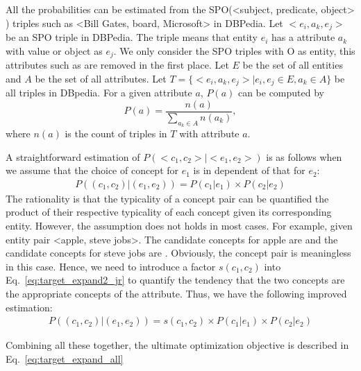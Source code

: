 All the probabilities can be estimated from the SPO(\ac{<subject, predicate, object>} ) triples such as \ac{<Bill Gates, board, Microsoft>}  in DBPedia.
Let $<e_i, a_k, e_j>$ be an SPO triple in DBPedia.
The triple means that entity $e_i$ has a attribute $a_k$ with value or object as $e_j$.
We only consider the SPO triples with O as entity, this attributes such as  are removed in the first place.
Let $E$ be the set of all entities and $A$ be the set of all attributes.
Let $T=\{<e_i, a_k, e_j> | e_i,e_j\in E, a_k\in A\}$ be all triples in DBpedia.
For a given attribute $a$, $P(a)$ can be computed by
\begin{equation}
\label{eq:pa}
P(a)=\frac{n(a)}{\sum_{a_k\in A}{n(a_k)}},
\end{equation}
where $n(a)$ is the count of triples in $T$ with attribute $a$.

A straightforward estimation of $P(<c_{1},c_{2}>|<e_{1},e_{2}>)$ is as follows when we assume that the choice of concept for $e_1$ is in dependent of that for $e_2$:
\begin{equation}
\label{eq:target_expand2_naive}
\begin{split}
P((c_{1},c_{2})|(e_{1},e_{2})) = P(c_1|e_1) \times P(c_2|e_2)
\end{split}
\end{equation} The rationality is that the typicality of a concept pair can be quantified the product of their respective typicality of each concept given its corresponding entity.
However, the assumption does not holds in most cases. For example, given entity pair \ac{<apple, steve jobs>}. The candidate concepts for \ac{apple} are  and the candidate concepts for \ac{steve jobs} are . Obviously, the concept pair  is meaningless in this case. Hence, we need to introduce a factor $s(c_1,c_2)$ into Eq.~\ref{eq:target_expand2_jr} to quantify the tendency that the two concepts are the appropriate concepts of the attribute. Thus, we have the following improved estimation:
\begin{equation}
\label{eq:target_expand2_jr}
\begin{split}
P((c_{1},c_{2})|(e_{1},e_{2})) = s(c_1,c_2) \times P(c_1|e_1) \times P(c_2|e_2)
\end{split}
\end{equation}


Combining all these together, the ultimate optimization objective is described in Eq.~\ref{eq:target_expand_all}


